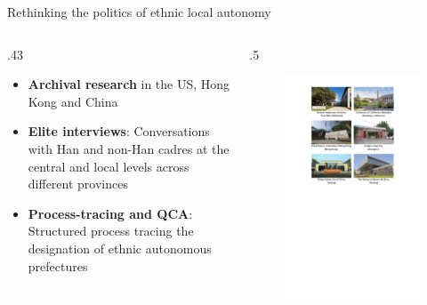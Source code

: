\documentclass[
  10pt,
  ignorenonframetext,
]{beamer}
\def\begincols{\begin{columns}}
\def\begincol{\begin{column}}
\def\endcol{\end{column}}
\def\endcols{\end{columns}}
\begin{document}
\begin{frame}{Rethinking the politics of ethnic local autonomy}
\label{rethinking-the-politics-of-ethnic-local-autonomy-1}
\begincols
\begincol{.43\textwidth}
  \begin{small}
  \begin{itemize}
  \item \textbf{Archival research} in the US, Hong Kong and China
  \vspace{0.35cm}
  \item \textbf{Elite interviews}: Conversations with Han and non-Han cadres at the central and local levels across different provinces
  \vspace{0.35cm}
  \item \textbf{Process-tracing and QCA}: Structured process tracing the designation of ethnic autonomous prefectures
  \end{itemize}
  \end{small}
  \endcol
  \begincol{.5\textwidth}
  \vspace{0.5cm}
  \begin{figure}
  \centering
  \includegraphics[scale=0.43]{Figs/sites_6}
  \end{figure}
  \endcol
\endcols
\end{frame}
\end{document}
